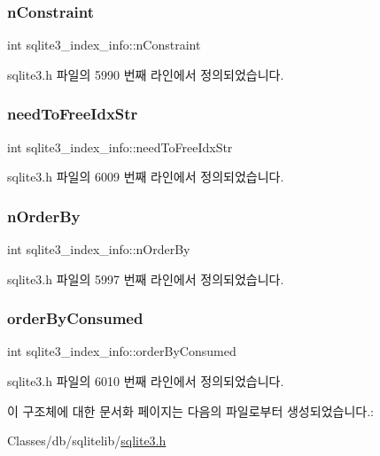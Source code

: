 \subsubsection{\texorpdfstring{n\+Constraint}{nConstraint}}
{\footnotesize\ttfamily int sqlite3\+\_\+index\+\_\+info\+::n\+Constraint}



sqlite3.\+h 파일의 5990 번째 라인에서 정의되었습니다.

\mbox{\label{structsqlite3__index__info_a5410066c067c3891cdf165c70cc4d6b1}} 
\subsubsection{\texorpdfstring{need\+To\+Free\+Idx\+Str}{needToFreeIdxStr}}
{\footnotesize\ttfamily int sqlite3\+\_\+index\+\_\+info\+::need\+To\+Free\+Idx\+Str}



sqlite3.\+h 파일의 6009 번째 라인에서 정의되었습니다.

\mbox{\label{structsqlite3__index__info_a3ef850fdc57eddbc8189fe84d0a9044e}} 
\subsubsection{\texorpdfstring{n\+Order\+By}{nOrderBy}}
{\footnotesize\ttfamily int sqlite3\+\_\+index\+\_\+info\+::n\+Order\+By}



sqlite3.\+h 파일의 5997 번째 라인에서 정의되었습니다.

\mbox{\label{structsqlite3__index__info_a5515d9de0f37f68d7e0930c20a668b29}} 
\subsubsection{\texorpdfstring{order\+By\+Consumed}{orderByConsumed}}
{\footnotesize\ttfamily int sqlite3\+\_\+index\+\_\+info\+::order\+By\+Consumed}



sqlite3.\+h 파일의 6010 번째 라인에서 정의되었습니다.



이 구조체에 대한 문서화 페이지는 다음의 파일로부터 생성되었습니다.\+:\begin{DoxyCompactItemize}
\item 
Classes/db/sqlitelib/\hyperlink{sqlite3_8h}{sqlite3.\+h}\end{DoxyCompactItemize}
